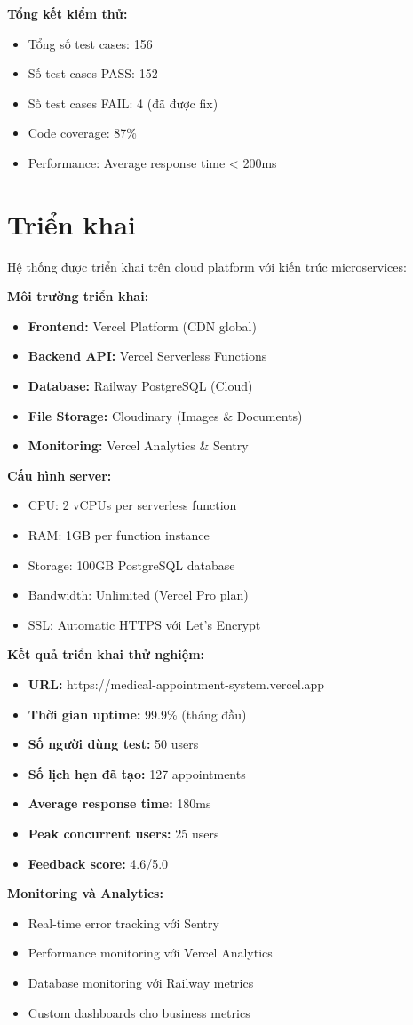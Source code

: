 \documentclass[../DoAn.tex]{subfiles}
\begin{document}
\textbf{Tổng kết kiểm thử:}
\begin{itemize}
    \item Tổng số test cases: 156
    \item Số test cases PASS: 152
    \item Số test cases FAIL: 4 (đã được fix)
    \item Code coverage: 87\%
    \item Performance: Average response time < 200ms
\end{itemize}

\section{Triển khai}

Hệ thống được triển khai trên cloud platform với kiến trúc microservices:

\textbf{Môi trường triển khai:}
\begin{itemize}
    \item \textbf{Frontend:} Vercel Platform (CDN global)
    \item \textbf{Backend API:} Vercel Serverless Functions
    \item \textbf{Database:} Railway PostgreSQL (Cloud)
    \item \textbf{File Storage:} Cloudinary (Images \& Documents)
    \item \textbf{Monitoring:} Vercel Analytics \& Sentry
\end{itemize}

\textbf{Cấu hình server:}
\begin{itemize}
    \item CPU: 2 vCPUs per serverless function
    \item RAM: 1GB per function instance
    \item Storage: 100GB PostgreSQL database
    \item Bandwidth: Unlimited (Vercel Pro plan)
    \item SSL: Automatic HTTPS với Let's Encrypt
\end{itemize}

\textbf{Kết quả triển khai thử nghiệm:}
\begin{itemize}
    \item \textbf{URL:} https://medical-appointment-system.vercel.app
    \item \textbf{Thời gian uptime:} 99.9\% (tháng đầu)
    \item \textbf{Số người dùng test:} 50 users
    \item \textbf{Số lịch hẹn đã tạo:} 127 appointments
    \item \textbf{Average response time:} 180ms
    \item \textbf{Peak concurrent users:} 25 users
    \item \textbf{Feedback score:} 4.6/5.0
\end{itemize}

\textbf{Monitoring và Analytics:}
\begin{itemize}
    \item Real-time error tracking với Sentry
    \item Performance monitoring với Vercel Analytics
    \item Database monitoring với Railway metrics
    \item Custom dashboards cho business metrics
\end{itemize}
\end{document}
